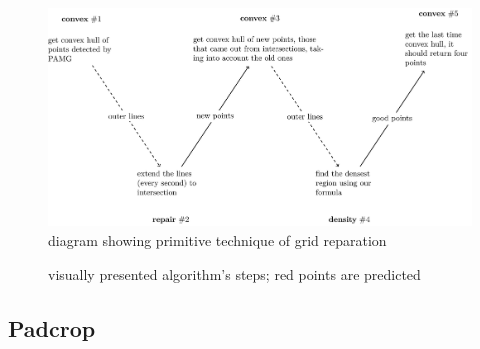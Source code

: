 \documentclass[letterpaper, 12pt]{article}
\begin{document}
\begin{figure}[H]
\centering
\includegraphics[width=\columnwidth]{figure8}
\caption{diagram showing primitive technique of grid reparation}
\end{figure}

\begin{figure}[H]
\centering
{}
\caption{visually presented algorithm's steps; red points are predicted}
\end{figure}

\subsection{Padcrop}
\end{document}
